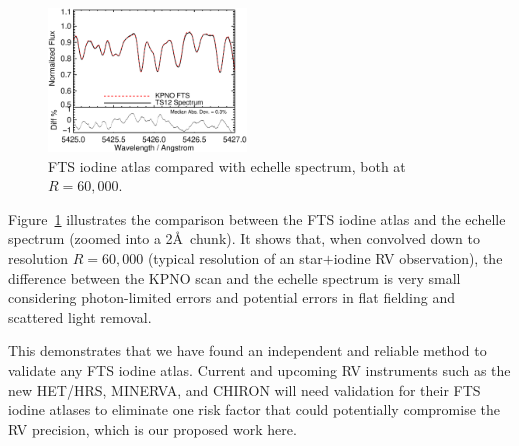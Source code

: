 \documentclass[12pt]{article}
\def\minerva{MINERVA}
\def\hrs{HET/HRS}
\begin{document}
\begin{figure}
  \vspace{-35pt}
  \begin{center}
    \includegraphics[width=0.47\textwidth]{fts}
  \end{center}
  \vspace{-25pt}  
  \caption{FTS iodine atlas compared with echelle spectrum, both
    at $R=60,000$.}  
  \vspace{-8pt}  
  \label{fig:fts}
\end{figure}

Figure~\ref{fig:fts} illustrates the comparison between the FTS iodine
atlas and the echelle spectrum (zoomed into a 2\AA\ chunk). It shows
that, when convolved down to resolution $R=60,000$ (typical resolution
of an star$+$iodine RV observation), the difference between the KPNO
scan and the echelle spectrum is very small considering photon-limited
errors and potential errors in flat fielding and scattered light
removal.

This demonstrates that we have found an independent and reliable
method to validate any FTS iodine atlas. Current and upcoming RV
instruments such as the new \hrs, \minerva, and CHIRON will need
validation for their FTS iodine atlases to eliminate one risk factor
that could potentially compromise the RV precision, which is our
proposed work here.
\end{document}
